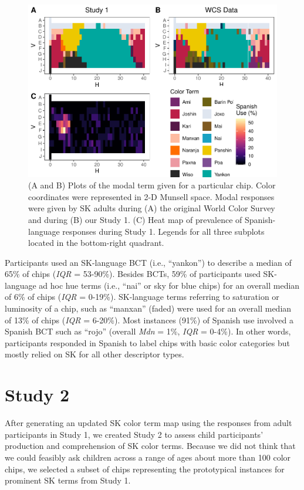 \documentclass[
  english,
  ,man,floatsintext]{apa6}
\begin{document}
\begin{figure}
\centering
\includegraphics{amazon_color_files/figure-latex/study1-figure-1.pdf}
\caption{\label{fig:study1-figure}(A and B) Plots of the modal term given for a particular chip. Color coordinates were represented in 2-D Munsell space. Modal responses were given by SK adults during (A) the original World Color Survey and during (B) our Study 1. (C) Heat map of prevalence of Spanish-language responses during Study 1. Legends for all three subplots located in the bottom-right quadrant.}
\end{figure}

Participants used an SK-language BCT (i.e., \enquote{yankon}) to describe a median of 65\% of chips (\emph{IQR} = 53-90\%). Besides BCTs, 59\% of participants used SK-language ad hoc hue terms (i.e., \enquote{nai} or sky for blue chips) for an overall median of 6\% of chips (\emph{IQR} = 0-19\%). SK-language terms referring to saturation or luminosity of a chip, such as \enquote{manxan} (faded) were used for an overall median of 13\% of chips (\emph{IQR} = 6-20\%). Most instances (91\%) of Spanish use involved a Spanish BCT such as \enquote{rojo} (overall \emph{Mdn} = 1\%, \emph{IQR} = 0-4\%). In other words, participants responded in Spanish to label chips with basic color categories but mostly relied on SK for all other descriptor types.

\hypertarget{study-2}{%
\section{Study 2}\label{study-2}}

After generating an updated SK color term map using the responses from adult participants in Study 1, we created Study 2 to assess child participants' production and comprehension of SK color terms. Because we did not think that we could feasibly ask children across a range of ages about more than 100 color chips, we selected a subset of chips representing the prototypical instances for prominent SK terms from Study 1.
\end{document}
